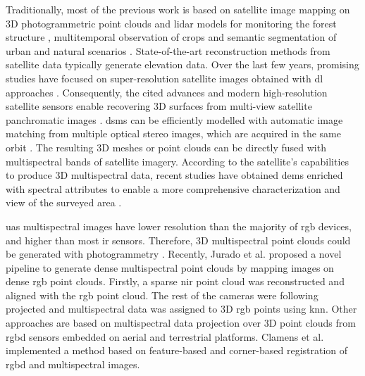 Traditionally, most of the previous work is based on satellite image mapping on 3D photogrammetric point clouds and \acrshort{lidar} models for monitoring the forest structure \cite{bolton_optimizing_2020, lechner_applications_2020}, multitemporal observation of crops \cite{gadiraju_multimodal_2020, qadeer_spatio-temporal_2021} and semantic segmentation of urban and natural scenarios \cite{ballouch_toward_2022, saralioglu_semantic_2020}. State-of-the-art reconstruction methods from satellite data typically generate elevation data. Over the last few years, promising studies have focused on super-resolution satellite images obtained with \acrshort{dl} approaches \cite{gomez_experimental_2022, stucker_resdepth_2022}. Consequently, the cited advances and modern high-resolution satellite sensors enable recovering 3D surfaces from multi-view satellite panchromatic images \cite{han_state_2020, rothermel_photometric_2020}. \acrshort{dsm}s can be efficiently modelled with automatic image matching from multiple optical stereo images, which are acquired in the same orbit \cite{gui_automated_2021, qin_critical_2019}. The resulting 3D meshes or point clouds can be directly fused with multispectral bands of satellite imagery. According to the satellite's capabilities to produce 3D multispectral data, recent studies have obtained \acrshort{dem}s enriched with spectral attributes to enable a more comprehensive characterization and view of the surveyed area \cite{dalponte_mapping_2020, sagan_field-scale_2021, wang_extraction_2020}. 

\acrshort{uas} multispectral images have lower resolution than the majority of \acrshort{rgb} devices, and higher than most \acrshort{ir} sensors. Therefore, 3D multispectral point clouds could be generated with photogrammetry \cite{liu_registration_2018, zainuddin_3d_2019, shen_estimation_2019, villacres_construction_2022, comba_unsupervised_2018}. Recently, Jurado et al. \cite{jurado_multispectral_2020} proposed a novel pipeline to generate dense multispectral point clouds by mapping images on dense \acrshort{rgb} point clouds. Firstly, a sparse \acrshort{nir} point cloud was reconstructed and aligned with the \acrshort{rgb} point cloud. The rest of the cameras were following projected and multispectral data was assigned to 3D \acrshort{rgb} points using \acrshort{knn}. Other approaches are based on multispectral data projection over 3D point clouds from \acrshort{rgbd} sensors embedded on aerial and terrestrial platforms. Clamens et al. \cite{clamens_real-time_2021} implemented a method based on feature-based and corner-based registration of \acrshort{rgbd} and multispectral images.

